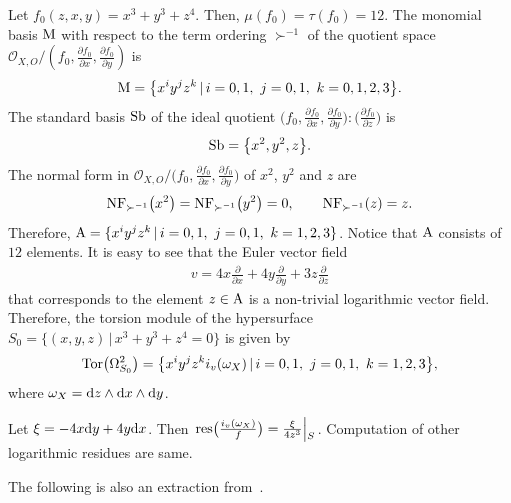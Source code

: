 \documentclass[pdftex]{sigma}%
\numberwithin{equation}{section}
\begin{document}
\begin{Example}
Let $ f_0(z,x,y) = x^3+y^3+z^4$. Then, $ \mu(f_0)=\tau(f_0)=12$.
The monomial basis $ {\rm M} $ with respect to the term ordering $ \succ^{-1} $ of the quotient space
$ {\mathcal O}_{X,O}/(f_0, \frac{\partial f_0}{\partial x}, \frac{\partial f_0}{\partial y}) $ is
\begin{gather*}
{\rm M} = \big\{ x^i y^j z^k \,|\, i=0,1, \ j=0,1, \ k=0,1,2,3 \big\}.
\end{gather*}
The standard basis $ {\rm Sb}$ of the ideal quotient
$\big(f_0, \frac{\partial f_0}{\partial x}, \frac{\partial f_0}{\partial y}\big): \big(\frac{\partial f_0}{\partial z}\big)$ is
\begin{gather*}
{\rm Sb} = \big\{ x^2, y^2, z \big\}.
\end{gather*}
The normal form in ${\mathcal O}_{X,O}/\big(f_0, \frac{\partial f_0}{\partial x}, \frac{\partial f_0}{\partial y}\big)$ of $x^2$, $y^2$ and $z$ are
\begin{gather*}
{\rm NF}_{\succ^{-1}}\big(x^2\big) = {\rm NF}_{\succ^{-1}}\big(y^2\big) = 0,\qquad
 {\rm NF}_{\succ^{-1}}(z) = z.
\end{gather*}
Therefore,
$ {\rm A} = \{x^iy^jz^k \,|\, i=0,1, \ j=0,1, \ k=1,2,3 \}$. Notice that ${\rm A}$ consists of $12$ elements. It is easy to see that the Euler vector field
\begin{gather*}
v= 4x\frac{\partial}{\partial x} + 4y\frac{\partial}{\partial y} +3z\frac{\partial}{\partial z}
\end{gather*}
that corresponds to the element $ z \in {\rm A} $ is a non-trivial logarithmic vector field. Therefore, the torsion module of the hypersurface
$ S_0 = \big\{ (x, y,z) \,|\, x^3+y^3+z^4=0 \big\} $ is given by
\begin{gather*}
{\rm Tor}\big(\Omega_{S_0}^2\big) = \big\{ x^iy^jz^k i_v(\omega_X) \,|\, i=0,1, \ j=0,1, \ k=1,2,3 \big\},
\end{gather*}
where $ \omega_X = {\rm d}z \wedge {\rm d}x \wedge {\rm d}y$.

Let $ \xi = -4x{\rm d}y+4y{\rm d}x$. Then $\left. {\rm res}\big(\frac{i_v(\omega_X)}{f}\big) = \frac{\xi}{4z^3}\middle|\raisebox{-0.7ex}[1ex][-2ex]{{\hspace{-1mm}\;$_S$}}\right.$. Computation of other logarithmic residues are same.
\end{Example}

The following is also an extraction from~\cite{TN20}.
\end{document}
